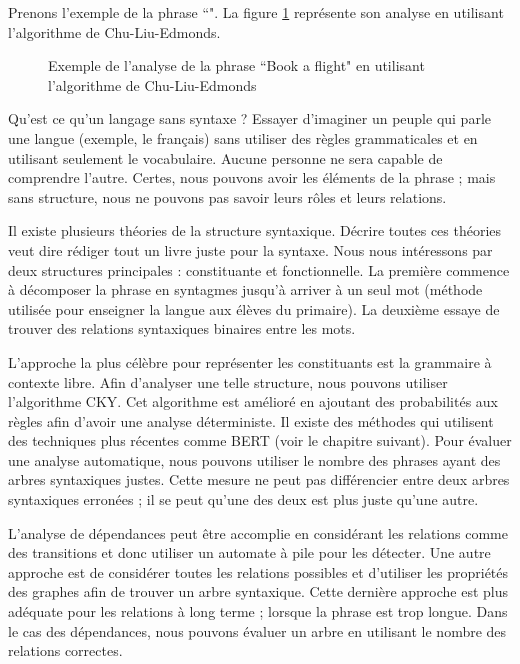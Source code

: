 \documentclass{KodeBook}
\begin{document}
Prenons l'exemple de la phrase ``".
La figure \ref{fig:cke-exp} représente son analyse en utilisant l'algorithme de Chu-Liu-Edmonds. 

\begin{figure}[ht]
	\centering
	\caption[Exemple de l'analyse Chu-Liu-Edmonds]{Exemple de l'analyse de la phrase ``Book a flight" en utilisant l'algorithme de Chu-Liu-Edmonds \cite{2019-jurafsky-martin}\label{fig:cke-exp}}
\end{figure}

Qu'est ce qu'un langage sans syntaxe ?
Essayer d'imaginer un peuple qui parle une langue (exemple, le français) sans utiliser des règles grammaticales et en utilisant seulement le vocabulaire. 
Aucune personne ne sera capable de comprendre l'autre. 
Certes, nous pouvons avoir les éléments de la phrase ; mais sans structure, nous ne pouvons pas savoir leurs rôles et leurs relations. 

Il existe plusieurs théories de la structure syntaxique. 
Décrire toutes ces théories veut dire rédiger tout un livre juste pour la syntaxe. 
Nous nous intéressons par deux structures principales : constituante et fonctionnelle.
La première commence à décomposer la phrase en syntagmes jusqu'à arriver à un seul mot (méthode utilisée pour enseigner la langue aux élèves du primaire). 
La deuxième essaye de trouver des relations syntaxiques binaires entre les mots.

L'approche la plus célèbre pour représenter les constituants est la grammaire à contexte libre. 
Afin d'analyser une telle structure, nous pouvons utiliser l'algorithme CKY. 
Cet algorithme est amélioré en ajoutant des probabilités aux règles afin d'avoir une analyse déterministe. 
Il existe des méthodes qui utilisent des techniques plus récentes comme BERT (voir le chapitre suivant). 
Pour évaluer une analyse automatique, nous pouvons utiliser le nombre des phrases ayant des arbres syntaxiques justes. 
Cette mesure ne peut pas différencier entre deux arbres syntaxiques erronées ; il se peut qu'une des deux est plus juste qu'une autre. 

L'analyse de dépendances peut être accomplie en considérant les relations comme des transitions et donc utiliser un automate à pile pour les détecter.
Une autre approche est de considérer toutes les relations possibles et d'utiliser les propriétés des graphes afin de trouver un arbre syntaxique. 
Cette dernière approche est plus adéquate pour les relations à long terme ; lorsque la phrase est trop longue.
Dans le cas des dépendances, nous pouvons évaluer un arbre en utilisant le nombre des relations correctes.
\end{document}
